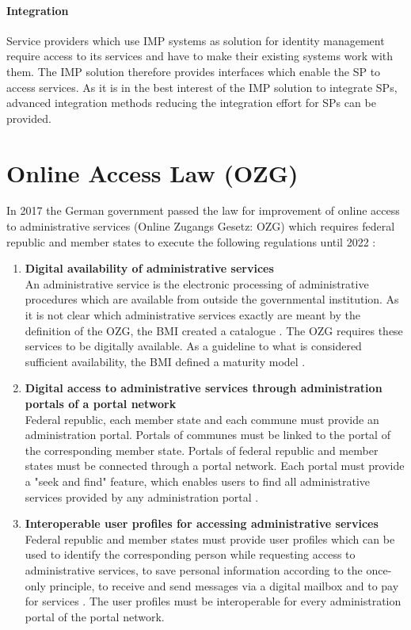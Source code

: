 \documentclass[
     12pt,         %
     a4paper,      %
     BCOR=10mm,version=first,     %
     DIV=14,version=first,        %
     ]{scrreprt}
\begin{document}
\paragraph{Integration}
Service providers which use IMP systems as solution for identity management require access to its services and have to make their existing systems work with them. The IMP solution therefore provides interfaces which enable the SP to access services. As it is in the best interest of the IMP solution to integrate SPs, advanced integration methods reducing the integration effort for SPs can be provided. 

\section{Online Access Law (OZG)}
In 2017 the German government passed the law for improvement of online access to administrative services (Online Zugangs Gesetz: OZG) which requires federal republic and member states to execute the following regulations until 2022 \cite{BMI:OZG_Wortlaut}:
\begin{enumerate}
    \item \textbf{Digital availability of administrative services} \\
    An administrative service is the electronic processing of administrative procedures which are available from outside the governmental institution.  As it is not clear which administrative services exactly are meant by the definition of the OZG, the BMI created a catalogue \cite{BMI:Verwaltungsleistungen}. The OZG requires these services to be digitally available. As a guideline to what is considered sufficient availability, the BMI defined a maturity model \cite{BMI:Digitale_Services}.
    \item \textbf{Digital access to administrative services through administration portals of a portal network} \\
    Federal republic, each member state and each commune must provide an administration portal. Portals of communes must be linked to the portal of the corresponding member state. Portals of federal republic and member states must be connected through a portal network. \cite{BMI:Portalverbund} Each portal must provide a "seek and find" feature, which enables users to find all administrative services provided by any administration portal \cite{Cotar:Drucksache_19/19089}. 
    \item \textbf{Interoperable user profiles for accessing administrative services} \\
    Federal republic and member states must provide user profiles which can be used to identify the corresponding person while requesting access to administrative services, to save personal information according to the once-only principle, to receive and send messages via a digital mailbox and to pay for services \cite{Cotar:Drucksache_19/19089}. The user profiles must be interoperable for every administration portal of the portal network.
\end{enumerate}
\end{document}
